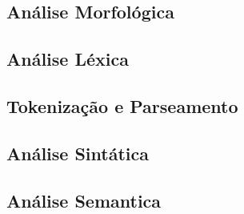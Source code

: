 {\subsection{Análise Morfológica}

\subsection{Análise Léxica}

\subsection{Tokenização e Parseamento}

\subsection{Análise Sintática}

\subsection{Análise Semantica}
}
